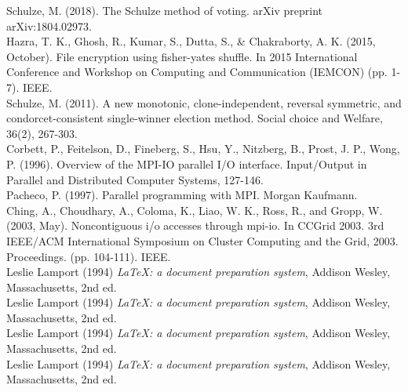 \documentclass[final,5p,times,twocolumn,authoryear, 10pt]{elsarticle}
\begin{document}

\begin{thebibliography}{20}

Schulze, M. (2018). The Schulze method of voting. arXiv preprint
arXiv:1804.02973. 
\\
Hazra, T. K., Ghosh, R., Kumar, S., Dutta, S., \& Chakraborty, A. K. (2015,
October). File encryption using fisher-yates shuffle. In 2015 International
Conference and Workshop on Computing and Communication (IEMCON) (pp. 1-7).
IEEE.
\\ 
Schulze, M. (2011). A new monotonic, clone-independent, reversal symmetric, and
condorcet-consistent single-winner election method. Social choice and Welfare,
36(2), 267-303.
\\
Corbett, P., Feitelson, D., Fineberg, S., Hsu, Y., Nitzberg, B., Prost, J. P.,
Wong, P. (1996). Overview of the MPI-IO parallel I/O interface. Input/Output in
Parallel and Distributed Computer Systems, 127-146.
\\
Pacheco, P. (1997). Parallel programming with MPI. Morgan Kaufmann.
\\
Ching, A., Choudhary, A., Coloma, K., Liao, W. K., Ross, R., and Gropp, W.
(2003, May). Noncontiguous i/o accesses through mpi-io. In CCGrid 2003. 3rd
IEEE/ACM International Symposium on Cluster Computing and the Grid, 2003.
Proceedings. (pp. 104-111). IEEE. \\

Leslie Lamport (1994) \emph{\LaTeX: a document preparation system}, Addison
Wesley, Massachusetts, 2nd ed.
\\
Leslie Lamport (1994) \emph{\LaTeX: a document preparation system}, Addison
Wesley, Massachusetts, 2nd ed.
\\
Leslie Lamport (1994) \emph{\LaTeX: a document preparation system}, Addison
Wesley, Massachusetts, 2nd ed.
\\
Leslie Lamport (1994) \emph{\LaTeX: a document preparation system}, Addison
Wesley, Massachusetts, 2nd ed.

\end{thebibliography}
\end{document}
